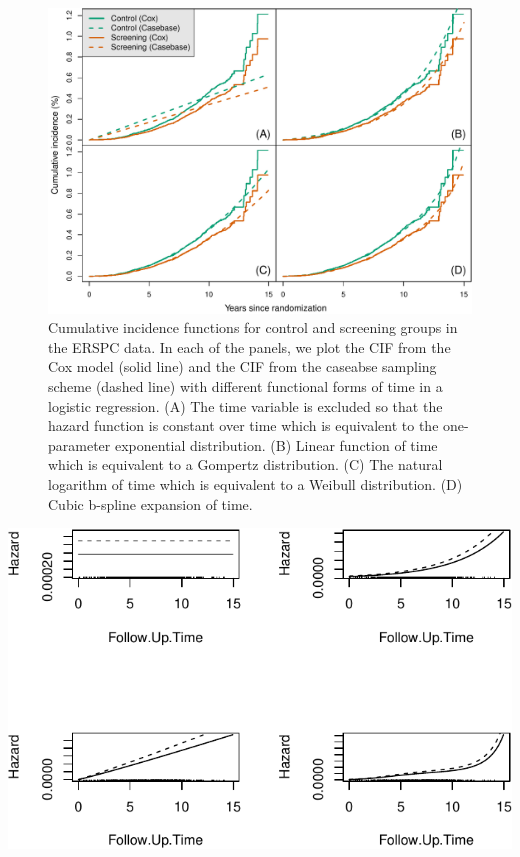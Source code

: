 \documentclass[
]{jss}
\begin{document}
\begin{CodeChunk}
\begin{figure}

{\centering \includegraphics{../figures/erspc-cox-cif-1} 

}

\caption[Cumulative incidence functions for control and screening groups in the ERSPC data]{Cumulative incidence functions for control and screening groups in the ERSPC data. In each of the panels, we plot the CIF from the Cox model (solid line) and the CIF from the caseabse sampling scheme (dashed line) with different functional forms of time in a logistic regression. (A) The time variable is excluded so that the hazard function is constant over time which is equivalent to the one-parameter exponential distribution. (B) Linear function of time which is equivalent to a Gompertz distribution. (C) The natural logarithm of time which is equivalent to a Weibull distribution. (D) Cubic b-spline expansion of time.}\label{fig:erspc-cox-cif}
\end{figure}
\end{CodeChunk}

\begin{CodeChunk}


\begin{center}\includegraphics{../figures/unnamed-chunk-1-1} \end{center}

\end{CodeChunk}
\end{document}
